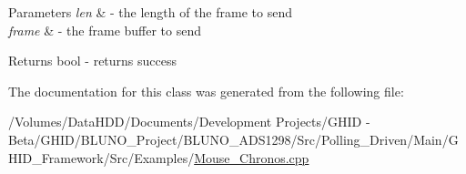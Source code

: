 \begin{DoxyParams}{\-Parameters}
{\em len} & -\/ the length of the frame to send \\
\hline
{\em frame} & -\/ the frame buffer to send \\
\hline
\end{DoxyParams}
\begin{DoxyReturn}{\-Returns}
bool -\/ returns success 
\end{DoxyReturn}


\-The documentation for this class was generated from the following file\-:\begin{DoxyCompactItemize}
\item 
/\-Volumes/\-Data\-H\-D\-D/\-Documents/\-Development Projects/\-G\-H\-I\-D -\/ Beta/\-G\-H\-I\-D/\-B\-L\-U\-N\-O\-\_\-\-Project/\-B\-L\-U\-N\-O\-\_\-\-A\-D\-S1298/\-Src/\-Polling\-\_\-\-Driven/\-Main/\-G\-H\-I\-D\-\_\-\-Framework/\-Src/\-Examples/\hyperlink{_mouse___chronos_8cpp}{\-Mouse\-\_\-\-Chronos.\-cpp}\end{DoxyCompactItemize}
